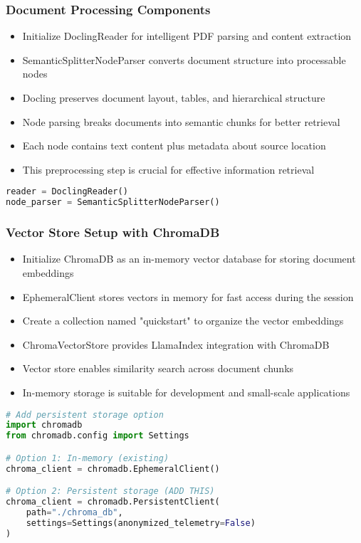\begin{frame}[fragile]\frametitle{Document Processing Components}
      \begin{itemize}
          \item Initialize DoclingReader for intelligent PDF parsing and content extraction
          \item SemanticSplitterNodeParser converts document structure into processable nodes
          \item Docling preserves document layout, tables, and hierarchical structure
          \item Node parsing breaks documents into semantic chunks for better retrieval
          \item Each node contains text content plus metadata about source location
          \item This preprocessing step is crucial for effective information retrieval
      \end{itemize}
      
\begin{lstlisting}[language=Python, basicstyle=\tiny]
reader = DoclingReader()
node_parser = SemanticSplitterNodeParser()
\end{lstlisting}
\end{frame}

\begin{frame}[fragile]\frametitle{Vector Store Setup with ChromaDB}
      \begin{itemize}
          \item Initialize ChromaDB as an in-memory vector database for storing document embeddings
          \item EphemeralClient stores vectors in memory for fast access during the session
          \item Create a collection named "quickstart" to organize the vector embeddings
          \item ChromaVectorStore provides LlamaIndex integration with ChromaDB
          \item Vector store enables similarity search across document chunks
          \item In-memory storage is suitable for development and small-scale applications
      \end{itemize}
      
\begin{lstlisting}[language=Python, basicstyle=\tiny]
# Add persistent storage option
import chromadb
from chromadb.config import Settings

# Option 1: In-memory (existing)
chroma_client = chromadb.EphemeralClient()

# Option 2: Persistent storage (ADD THIS)
chroma_client = chromadb.PersistentClient(
    path="./chroma_db",
    settings=Settings(anonymized_telemetry=False)
)
\end{lstlisting}
\end{frame}

